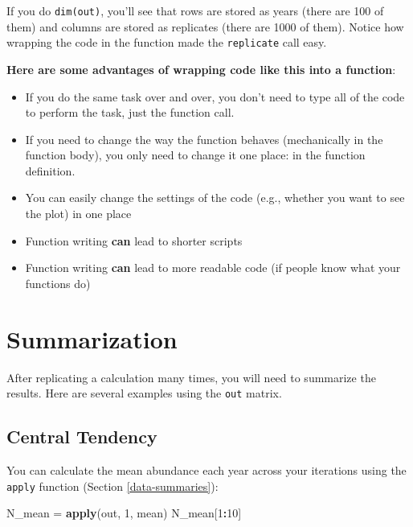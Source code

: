 \documentclass[]{book}
\newenvironment{Shaded}{\begin{snugshade}}{\end{snugshade}}
\newcommand{\KeywordTok}[1]{\textcolor[rgb]{0.13,0.29,0.53}{\textbf{#1}}}
\newcommand{\DecValTok}[1]{\textcolor[rgb]{0.00,0.00,0.81}{#1}}
\newcommand{\StringTok}[1]{\textcolor[rgb]{0.31,0.60,0.02}{#1}}
\newcommand{\OperatorTok}[1]{\textcolor[rgb]{0.81,0.36,0.00}{\textbf{#1}}}
\newcommand{\NormalTok}[1]{#1}
\providecommand{\tightlist}{%
  \setlength{\itemsep}{0pt}\setlength{\parskip}{0pt}}
\theoremstyle{definition}
\theoremstyle{definition}
\theoremstyle{definition}
\theoremstyle{remark}
\begin{document}
If you do \texttt{dim(out)}, you'll see that rows are stored as years
(there are 100 of them) and columns are stored as replicates (there are
1000 of them). Notice how wrapping the code in the function made the
\texttt{replicate} call easy.

\textbf{Here are some advantages of wrapping code like this into a
function}:

\begin{itemize}
\tightlist
\item
  If you do the same task over and over, you don't need to type all of
  the code to perform the task, just the function call.
\item
  If you need to change the way the function behaves (mechanically in
  the function body), you only need to change it one place: in the
  function definition.
\item
  You can easily change the settings of the code (e.g., whether you want
  to see the plot) in one place
\item
  Function writing \textbf{can} lead to shorter scripts
\item
  Function writing \textbf{can} lead to more readable code (if people
  know what your functions do)
\end{itemize}

\section{Summarization}\label{mc-summaries}

After replicating a calculation many times, you will need to summarize
the results. Here are several examples using the \texttt{out} matrix.

\subsection{Central Tendency}\label{central-tendency}

You can calculate the mean abundance each year across your iterations
using the \texttt{apply} function (Section \ref{data-summaries}):

\begin{Shaded}
\begin{Highlighting}[]
\NormalTok{N_mean =}\StringTok{ }\KeywordTok{apply}\NormalTok{(out, }\DecValTok{1}\NormalTok{, mean)}
\NormalTok{N_mean[}\DecValTok{1}\OperatorTok{:}\DecValTok{10}\NormalTok{]}
\end{Highlighting}
\end{Shaded}
\end{document}
